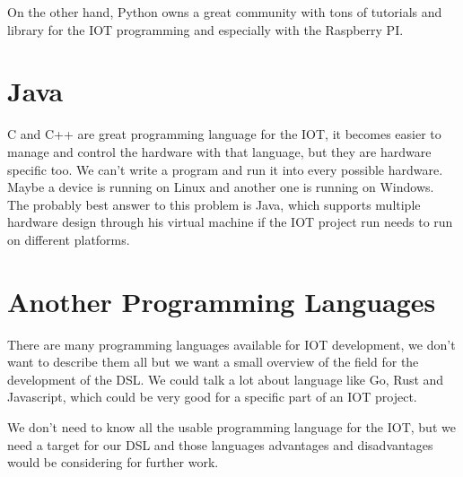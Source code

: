 On the other hand, Python owns a great community with tons of tutorials and library
for the IOT programming and especially with the Raspberry PI.

\section{Java}
\label{subsec:java}

C and C++ are great programming language for the IOT, it becomes easier to manage
and control the hardware with that language, but they are hardware specific
too. We can’t write a program and run it into every possible hardware. Maybe a
device is running on Linux and another one is running on Windows. The probably
best answer to this problem is Java\cite{Waher:2015:LIT:2789499}, which supports
multiple hardware design through his virtual machine if the IOT project run
needs to run on different platforms.

\section{Another Programming Languages}
\label{subsec:other-prog-lang}

There are many programming languages available for IOT development, we don’t want
to describe them all but we want a small overview of the field for the
development of the DSL. We could talk a lot about language like Go, Rust and
Javascript, which could be very good for a specific part of an IOT project.

We don’t need to know all the usable programming language for the IOT, but we
need a target for our DSL and those languages advantages and disadvantages
would be considering for further work.


